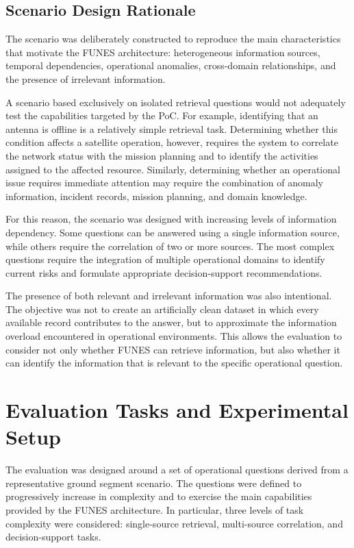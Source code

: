 \subsection{Scenario Design Rationale}

The scenario was deliberately constructed to reproduce the main characteristics that motivate the FUNES architecture: heterogeneous information sources, temporal dependencies, operational anomalies, cross-domain relationships, and the presence of irrelevant information.

A scenario based exclusively on isolated retrieval questions would not adequately test the capabilities targeted by the PoC. For example, identifying that an antenna is offline is a relatively simple retrieval task. Determining whether this condition affects a satellite operation, however, requires the system to correlate the network status with the mission planning and to identify the activities assigned to the affected resource. Similarly, determining whether an operational issue requires immediate attention may require the combination of anomaly information, incident records, mission planning, and domain knowledge.

For this reason, the scenario was designed with increasing levels of information dependency. Some questions can be answered using a single information source, while others require the correlation of two or more sources. The most complex questions require the integration of multiple operational domains to identify current risks and formulate appropriate decision-support recommendations.

The presence of both relevant and irrelevant information was also intentional. The objective was not to create an artificially clean dataset in which every available record contributes to the answer, but to approximate the information overload encountered in operational environments. This allows the evaluation to consider not only whether FUNES can retrieve information, but also whether it can identify the information that is relevant to the specific operational question.


\section{Evaluation Tasks and Experimental Setup}
\label{sec:evaluation tasks and setup}

The evaluation was designed around a set of operational questions derived from a representative ground segment scenario. The questions were defined to progressively increase in complexity and to exercise the main capabilities provided by the FUNES architecture. In particular, three levels of task complexity were considered: single-source retrieval, multi-source correlation, and decision-support tasks.

